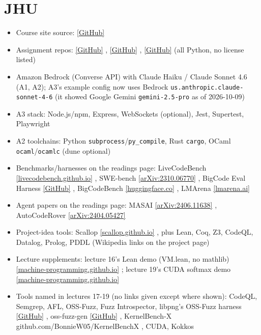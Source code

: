 \documentclass[10pt,oneside]{report}
\begin{document}
\section{JHU}
{\small\begin{itemize}
\item Course site source: \href{https://github.com/machine-programming/machine-programming.github.io}{[GitHub]}
\item Assignment repos: \href{https://github.com/machine-programming/assignment-1}{[GitHub]} , \href{https://github.com/machine-programming/assignment-2}{[GitHub]} , \href{https://github.com/machine-programming/assignment-3}{[GitHub]} (all Python, no license listed)
\item Amazon Bedrock (Converse API) with Claude Haiku / Claude Sonnet 4.6 (A1, A2); A3's example config now uses Bedrock \texttt{us.\allowbreak{}anthropic.\allowbreak{}claude-sonnet-4-6} (it showed Google Gemini \texttt{gemini-2.\allowbreak{}5-pro} as of 2026-10-09)
\item A3 stack: Node.js/npm, Express, WebSockets (optional), Jest, Supertest, Playwright
\item A2 toolchains: Python \texttt{subprocess}/\texttt{py\_\allowbreak{}compile}, Rust \texttt{cargo}, OCaml \texttt{ocaml}/\texttt{ocamlc} (dune optional)
\item Benchmarks/harnesses on the readings page: LiveCodeBench \href{https://livecodebench.github.io/}{[livecodebench.github.io]} , SWE-bench \href{https://arxiv.org/abs/2310.06770}{[arXiv:2310.06770]} , BigCode Eval Harness \href{https://github.com/bigcode-project/bigcode-evaluation-harness}{[GitHub]} , BigCodeBench \href{https://huggingface.co/blog/leaderboard-bigcodebench}{[huggingface.co]} , LMArena \href{https://lmarena.ai/?leaderboard}{[lmarena.ai]}
\item Agent papers on the readings page: MASAI \href{https://arxiv.org/pdf/2406.11638}{[arXiv:2406.11638]} , AutoCodeRover \href{https://arxiv.org/abs/2404.05427}{[arXiv:2404.05427]}
\item Project-idea tools: Scallop \href{https://scallop.github.io/}{[scallop.github.io]} , plus Lean, Coq, Z3, CodeQL, Datalog, Prolog, PDDL (Wikipedia links on the project page)
\item Lecture supplements: lecture 16's Lean demo (VM.lean, no mathlib) \href{https://machine-programming.github.io/lectures/lecture-16-VM.lean.txt}{[machine-programming.github.io]} ; lecture 19's CUDA softmax demo \href{https://machine-programming.github.io/lectures/lecture-19-cuda_softmax_demo.html}{[machine-programming.github.io]}
\item Tools named in lectures 17-19 (no links given except where shown): CodeQL, Semgrep, AFL, OSS-Fuzz, Fuzz Introspector, libpng's OSS-Fuzz harness \href{https://github.com/pnggroup/libpng/blob/libpng16/contrib/oss-fuzz/libpng_read_fuzzer.cc}{[GitHub]} , oss-fuzz-gen \href{https://github.com/google/oss-fuzz-gen}{[GitHub]} , KernelBench-X github.com/BonnieW05/KernelBenchX , CUDA, Kokkos
\end{itemize}}
\end{document}
